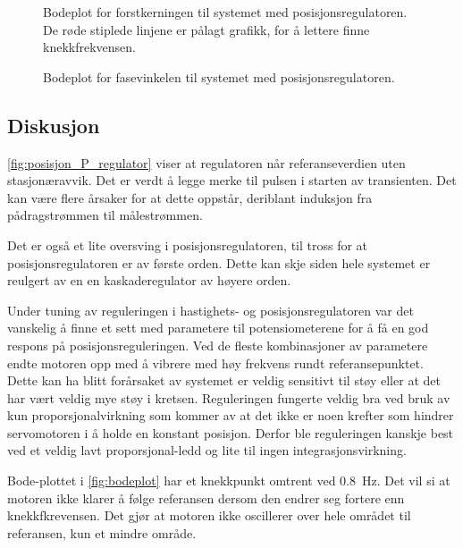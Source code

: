 \begin{figure}[h!]
    \centering
    
    \caption{Bodeplot for forstkerningen til systemet med posisjonsregulatoren. De røde stiplede linjene er pålagt grafikk, for å lettere finne knekkfrekvensen.}
    \label{fig:bodeplot}
\end{figure}

\begin{figure}[h!]
    \centering
    
    \caption{Bodeplot for fasevinkelen til systemet med posisjonsregulatoren.}
    \label{fig:bodeplot_fase}
\end{figure}

\FloatBarrier




\subsection{Diskusjon}

\autoref{fig:posisjon_P_regulator} viser at regulatoren når referanseverdien uten stasjonæravvik. Det er verdt å legge merke til pulsen i starten av transienten. 
Det kan være flere årsaker for at dette oppstår, deriblant induksjon fra pådragstrømmen til målestrømmen.

Det er også et lite oversving i posisjonsregulatoren, til tross for at posisjonsregulatoren er av første orden. Dette kan skje siden hele systemet er reulgert av en en kaskaderegulator av høyere orden.

Under tuning av reguleringen i hastighets- og posisjonsregulatoren var det vanskelig å finne et sett med parametere til potensiometerene for å få en god respons på posisjonsreguleringen. 
Ved de fleste kombinasjoner av parametere endte motoren opp med å vibrere med høy frekvens rundt referansepunktet. 
Dette kan ha blitt forårsaket av systemet er veldig sensitivt til støy eller at det har vært veldig mye støy i kretsen.
Reguleringen fungerte veldig bra ved bruk av kun proporsjonalvirkning som kommer av at det ikke er noen krefter som hindrer servomotoren i å holde en konstant posisjon.
Derfor ble reguleringen kanskje best ved et veldig lavt proporsjonal-ledd og lite til ingen integrasjonsvirkning.


Bode-plottet i \autoref{fig:bodeplot} har et knekkpunkt omtrent ved \SI{0.8}{\hertz}. Det vil si at motoren ikke klarer å følge referansen dersom den endrer seg fortere enn knekkfkrevensen. Det gjør at motoren ikke oscillerer over hele området til referansen, kun et mindre område. 

